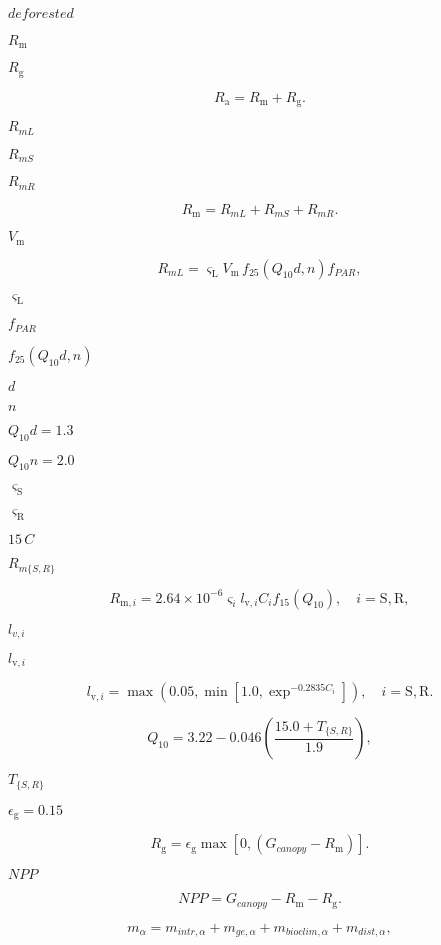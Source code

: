 \documentclass{article}
\begin{document}
{$\textit{deforested}$
\pagebreak

$R_\mathrm{m}$
\pagebreak

$R_\mathrm{g}$
\pagebreak

\[ R_\mathrm{a} =R_\mathrm{m} + R_\mathrm{g}. \]
\pagebreak

$R_{mL}$
\pagebreak

$R_{mS}$
\pagebreak

$R_{mR}$
\pagebreak

\[ \label{mainres_all} R_\mathrm{m} = R_{mL} + R_{mS} + R_{mR}. \]
\pagebreak

$V_\mathrm{m}$
\pagebreak

\[ R_{mL} = \varsigma_\mathrm{L}V_\mathrm{m}\,f_{25}(Q_10d,n)f_{PAR}, \]
\pagebreak

$\varsigma_\mathrm{L}$
\pagebreak

$f_{PAR}$
\pagebreak

$f_{25}(Q_10d,n)$
\pagebreak

$d$
\pagebreak

$n$
\pagebreak

$Q_10d=1.3$
\pagebreak

$Q_10n=2.0$
\pagebreak

$\varsigma_\mathrm{S}$
\pagebreak

$\varsigma_\mathrm{R}$
\pagebreak

$15\,C$
\pagebreak

$R_{m\{S,R\}}$
\pagebreak

\[ \label{r_msr} R_{\mathrm{m},i} = 2.64 \times 10^{-6}\varsigma_{i}l_{\mathrm{v}, i}C_{i}f_{15}(Q_{10}),\quad i = \mathrm{S}, \mathrm{R}, \]
\pagebreak

$l_{v,i}$
\pagebreak

$l_{\mathrm{v},i}$
\pagebreak

\[ l_{\mathrm{v},i} = \max(0.05, \min[1.0, \exp^{-0.2835 C_i} ]),\quad i = \mathrm{S}, \mathrm{R}. \]
\pagebreak

\[ Q_{10} = 3.22 - 0.046 \left(\frac{15.0 + T_{\{S,R\}}}{1.9}\right), \]
\pagebreak

$T_{\{S,R\}}$
\pagebreak

$\epsilon_\mathrm{g}=0.15$
\pagebreak

\[ \label{growth_res} R_\mathrm{g}=\epsilon_\mathrm{g}\max[0,(G_{canopy} - R_\mathrm{m})]. \]
\pagebreak

$NPP$
\pagebreak

\[ NPP = G_{canopy} - R_\mathrm{m} - R_\mathrm{g}. \]
\pagebreak

\[ \label{mortality} m_{\alpha} = m_{intr,\alpha} + m_{ge,\alpha} + m_{bioclim,\alpha} + m_{dist,\alpha}, \]
\pagebreak

}
\end{document}
